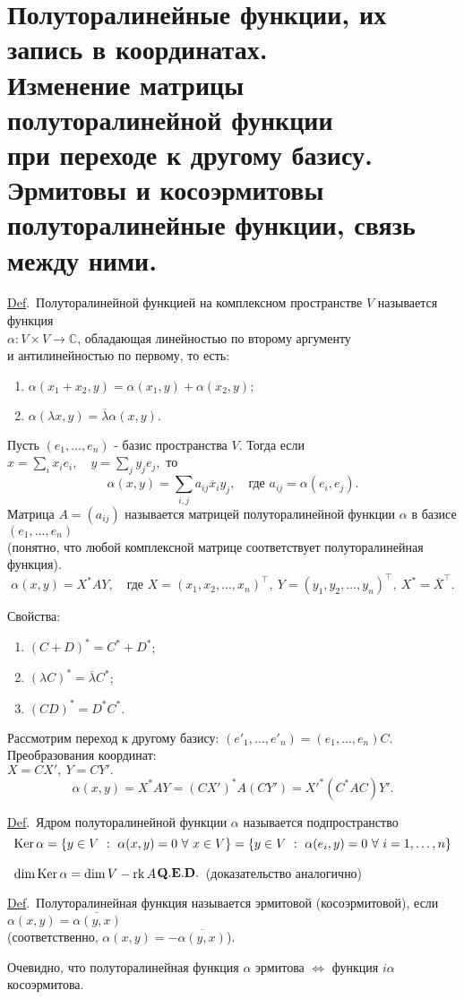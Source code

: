 \documentclass[a4paper]{article}%
\renewcommand{\rk}{{\rm rk\,}}%
\renewcommand{\de}{\par\noindent\underline{Def}.\ }%
\renewcommand{\ab}{\par\noindent}%
\newcommand{\te}{\par\noindent{\bf Теорема.}\ }%
\newcommand{\qed}{\quad${{\bf Q.E.D.}}$}
\newcommand{\baz}[1]{\left(#1_1,\dots,#1_n\right)}%
\newcommand{\lr}{\Leftrightarrow}%
\renewcommand{\nn}[1]{#1_1,#1_2,\dots,#1_n}%
\newcommand{\rom}[1]{{\rm#1\,}}
\begin{document}
\section{Полуторалинейные функции, их запись в координатах.\\ Изменение матрицы полуторалинейной функции\\ при переходе к другому базису.
Эрмитовы и косоэрмитовы\\ полуторалинейные функции, связь между ними.} %
\label{q21}%
\de Полуторалинейной функцией на комплексном пространстве $V$ называется функция\\ $\alpha: V\times V\rightarrow
\mathbb{C}$, обладающая линейностью по второму аргументу\\ и антилинейностью по первому, то есть:
\begin{enumerate}
    \item $\alpha(x_1+x_2, y)=\alpha(x_1,y)+\alpha(x_2,y);$
    \item $\alpha(\lambda x, y)=\overline{\lambda}\alpha(x,y).$
\end{enumerate}
\ab Пусть $\baz{e}$ - базис пространства $V$. Тогда если $x=\sum\limits_ix_ie_i,\quad y=\sum\limits_jy_je_j,$ то
$$
\alpha(x,y)=\sum_{i,j}a_{ij}\overline{x}_iy_j,\quad\mbox{где }a_{ij}=\alpha(e_i,e_j).
$$
Матрица $A=(a_{ij})$ называется матрицей полуторалинейной функции $\alpha$ в базисе $\baz{e}$\\ (понятно, что
любой комплексной матрице соответствует полуторалинейная функция).
$$
\alpha(x,y)=X^* AY,\quad\mbox{где }X=(\nn{x})^\top,\ Y=(\nn{y})^\top,\ X^*=\overline{X}^\top .
$$
\ab Свойства:
\begin{enumerate}
    \item $(C+D)^*=C^*+D^*$;
    \item $(\lambda C)^*=\overline{\lambda}C^*$;
    \item $(CD)^*=D^*C^*.$
\end{enumerate}
\ab Рассмотрим переход к другому базису: $\baz{e'}=\baz{e}C.$ Преобразования координат:\\ $X=CX',\ Y=CY'.$
$$
\alpha(x,y)=X^*AY=(CX')^*A(CY')=X'^*(C^*AC)Y'.
$$
\de Ядром полуторалинейной функции $\alpha$ называется подпространство $$\rom{Ker}\alpha=\{y\in V\ :\
\alpha(x,y)=0\ \forall\ x\in V\}=\{y\in V\ :\ \alpha(e_i,y)=0\ \forall\ i=1,\dots ,n\}$$ %
\te $\dim\rom{Ker}\alpha=\dim V-\rk A$\qed\ (доказательство аналогично)%
\de Полуторалинейная функция называется эрмитовой (косоэрмитовой), если
$\alpha(x,y)=\overline{\alpha(y,x)}$\\
(соответственно, $\alpha(x,y)=-\overline{\alpha(y,x)}$). %
\ab Очевидно, что полуторалинейная функция $\alpha$ эрмитова $\lr$ функция $i\alpha$ косоэрмитова. %
\end{document}
